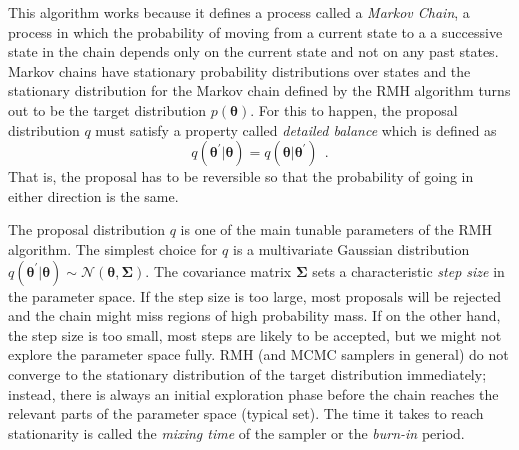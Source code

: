 \documentclass[12pt,dvipsnames]{report}
\renewcommand{\vec}[1]{\boldsymbol{\mathbf{#1}}}
\newcommand{\hquad}{~~}
\begin{document}
This algorithm works because it defines a process called a 
\emph{Markov Chain}, a process in which the probability of moving from a current state to a
a successive state in the chain depends only on the current state and not on any
past states.
Markov chains have stationary probability distributions over states and the stationary
distribution for the Markov chain defined by the RMH algorithm turns out to be
the target distribution $p(\bm\theta)$.
For this to happen, the proposal distribution $q$ must satisfy a property
called \emph{detailed balance} which is defined as
\begin{equation}
    q(\bm\theta^\prime\lvert\bm\theta)=q(\bm\theta\lvert\bm\theta^\prime)
    \hquad.
\end{equation}
That is, the proposal has to be reversible so that the probability of going in either 
direction is the same. 

The proposal distribution $q$ is one of the main tunable parameters
of the RMH algorithm.
The simplest choice for $q$ is a multivariate Gaussian distribution
 $q(\bm\theta^\prime\lvert\bm\theta)\sim\mathcal{N}(\bm\theta,\vec \Sigma)$.
 The covariance matrix $\vec \Sigma$ sets a characteristic 
\emph{step size} in the parameter space. If the step size is
too large, most proposals will be rejected and the chain might miss regions of high
probability mass.
If on the other hand, the step size is too small, most steps are likely to be accepted,
but we might not explore the parameter space fully.
RMH (and MCMC samplers in general) do not converge to the stationary distribution  
of the target distribution immediately; instead, there is always an initial exploration 
phase before the chain reaches the relevant parts of the parameter space 
(typical set).  The time it 
takes to reach stationarity is called the \emph{mixing time} of the sampler 
or the \emph{burn-in} period.
\end{document}
